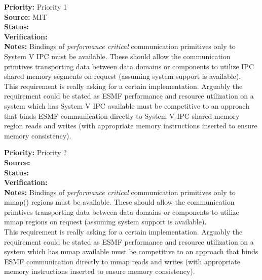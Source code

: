 \begin{reqlist}
{\bf Priority:} Priority 1 \\
{\bf Source:}  MIT \\
{\bf Status:}  \\
{\bf Verification:} \\
{\bf Notes:} Bindings of {\it performance critical} communication primitives only
to System V IPC must be available. These should allow the communication
primtives transporting data between data domains or components to
utilize IPC shared memory segments on request (assuming system support
is available). \\
This requirement is really asking for a certain implementation.
Arguably the requirement could be stated as ESMF performance
and resource utilization on a system which has System V IPC available must be
competitive to an approach that binds ESMF communication directly to System V IPC shared
memory region reads and writes (with appropriate memory
instructions inserted to ensure memory consistency).
\end{reqlist}

\begin{reqlist}
{\bf Priority:} Priority ? \\
{\bf Source:}  \\
{\bf Status:}  \\
{\bf Verification:} \\
{\bf Notes:} Bindings of {\it performance critical} communication primitives only
to mmap() regions must be available. These should allow the communication
primtives transporting data between data domains or components to
utilize mmap regions on request (assuming system support
is available).\\
This requirement is really asking for a certain implementation.
Arguably the requirement could be stated as ESMF performance
and resource utilization on a system which has mmap available must be
competitive to an approach that binds ESMF communication directly to mmap
reads and writes (with appropriate memory
instructions inserted to ensure memory consistency).
\end{reqlist}

